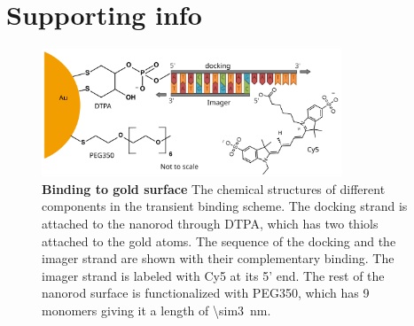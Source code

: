 \graphicspath{{chapters/c5_transient_binding/si-figures/}}
\section{Supporting info}
\begin{figure}[ht]
  \centering
  \includegraphics[width=0.8\textwidth]{AuNR-SS_bonding}
  \makeatletter
  \renewcommand{\fnum@figure}{\figurename~S\thefigure}
  \makeatother
  \caption{\textbf{Binding to gold surface} The chemical structures of different components in the transient binding scheme.
  The docking strand is attached to the nanorod through DTPA, which has two thiols attached to the gold atoms.
  The sequence of the docking and the imager strand are shown with their complementary binding.
  The imager strand is labeled with Cy5 at its 5' end.
  The rest of the nanorod surface is functionalized with PEG350, which has 9 monomers giving it a length of \SI{\sim3}{\nm}.}
  \label{SIfig:AuNR-SS_bonding}
\end{figure}


